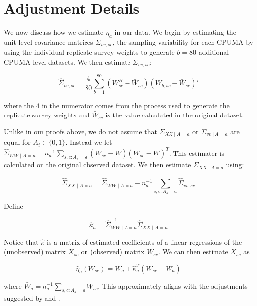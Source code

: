 \section{Adjustment Details}

We now discuss how we estimate $\eta_a$ in our data. We begin by estimating the unit-level covariance matrices $\Sigma_{vv, sc}$, the sampling variability for each CPUMA by using the individual replicate survey weights to generate $b = 80$ additional CPUMA-level datasets. We then estimate $\Sigma_{vv, sc}$:

\begin{equation}
\hat{\Sigma}_{vv, sc} = \frac{4}{80}\sum_{b=1}^{80}(W_{sc}^B - \bar{W}_{sc})(W_{b, sc} - \bar{W}_{sc})'
\end{equation}

where the $4$ in the numerator comes from the process used to generate the replicate survey weights and $\bar{W}_{sc}$ is the value calculated in the original dataset. 

Unlike in our proofs above, we do not assume that $\Sigma_{XX \mid A = a}$ or $\Sigma_{vv \mid A = a}$ are equal for $A_i \in \{0, 1\}$. Instead we let $\hat{\Sigma}_{WW \mid A = a} = n_a^{-1}\sum_{s, c: A_s = a} (W_{sc} - \bar{W})(W_{sc} - \bar{W})^T$. This estimator is calculated on the original observed dataset. We then estimate $\Sigma_{XX \mid A = a}$ using:

\begin{equation}
\hat{\Sigma}_{XX \mid A = a} = \hat{\Sigma}_{WW \mid A = a} - n_a^{-1}\sum_{s, c: A_s = a} \hat{\Sigma}_{vv, sc}
\end{equation}

Define

\begin{equation}
\hat{\kappa}_a = \hat{\Sigma}_{WW \mid A = a}^{-1}\hat{\Sigma}_{XX \mid A = a}
\end{equation}

Notice that $\hat{\kappa}$ is a matrix of estimated coefficients of a linear regressions of the (unobserved) matrix $X_{sc}$ on (observed) matrix $W_{sc}$. We can then estimate $X_{sc}$ as

\begin{equation}
\hat{\eta}_a(W_{sc}) = \bar{W}_a + \hat{\kappa}_a^T(W_{sc} - \bar{W}_a)
\end{equation}

where $\bar{W}_a = n_a^{-1}\sum_{s, c: A_s = a} W_{sc}$. This approximately aligns with the adjustments suggested by \cite{carroll2006measurement} and \cite{gleser1992importance}. 

